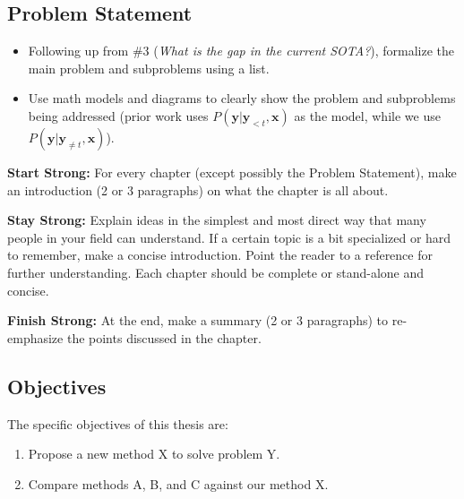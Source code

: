 \begin{singlespace}
    \chapter{Problem Statement}
    \label{ch:problem-statement}
\end{singlespace}

\begin{itemize}
    \item Following up from \#3 (\emph{What is the gap in the current SOTA?}), formalize the main problem and subproblems using a list.
    \item Use math models and diagrams to clearly show the problem and subproblems being addressed (\eg prior work uses $P(\mathbf{y} | \mathbf{y}_{<t}, \mathbf{x})$ as the model, while we use $P(\mathbf{y} | \mathbf{y}_{\neq t}, \mathbf{x})$).
\end{itemize}

\textbf{Start Strong:} For every chapter (except possibly the Problem Statement), make an introduction (2 or 3 paragraphs) on what the chapter is all about.

\textbf{Stay Strong:} Explain ideas in the simplest and most direct way that many people in your field can understand. If a certain topic is a bit specialized or hard to remember, make a concise introduction. Point the reader to a reference for further understanding. Each chapter should be complete or stand-alone and concise.

\textbf{Finish Strong:} At the end, make a summary (2 or 3 paragraphs) to re-emphasize the points discussed in the chapter.

\section{Objectives}

The specific objectives of this thesis are:
\begin{enumerate}
    \item Propose a new method X to solve problem Y.
    \item Compare methods A, B, and C against our method X.
\end{enumerate}
